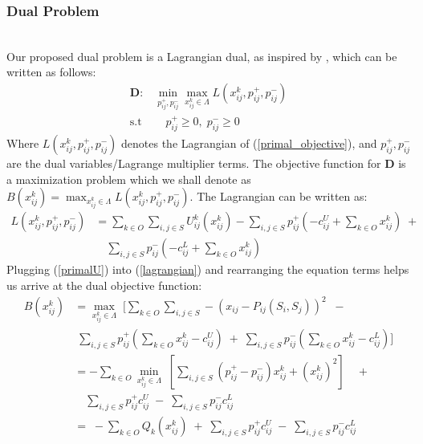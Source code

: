 \documentclass[sigconf]{acmart}
\begin{document}
\subsubsection{Dual Problem}\text{\\}
\\Our proposed dual problem is a Lagrangian dual, as inspired by \cite{low1999optimization}, which can be written as follows:
\begin{equation}\label{dual_problem}
\begin{aligned}
    \mathbf{D: } & \min_{p_{ij}^+, p_{ij}^-}\max_{x_{ij}^k \in \Lambda} L(x_{ij}^k, p_{ij}^+, p_{ij}^-)\\
    \text{s.t } & \quad p_{ij}^+ \geq 0, \; p_{ij}^- \geq 0
\end{aligned}
\end{equation}
Where $L(x_{ij}^k, p_{ij}^+, p_{ij}^-)$ denotes the Lagrangian of (\ref{primal_objective}), and $p_{ij}^+, p_{ij}^-$ are the dual variables/Lagrange multiplier terms. The objective function for $\mathbf{D}$ is a maximization problem which we shall denote as $B(x_{ij}^k) = \max_{x_{ij}^k \in \Lambda} L(x_{ij}^k, p_{ij}^+, p_{ij}^-)$. The Lagrangian can be written as:
\begin{equation}\label{lagrangian}
\begin{aligned}
    L(x_{ij}^k, p_{ij}^+, p_{ij}^-) & = \sum_{k \in O}\sum_{i, j \in S}U_{ij}^k(x_{ij}^k) - \sum_{i, j \in S} p_{ij}^+( - c_{ij}^U + \sum_{k \in O}x_{ij}^k) \; + \\
    & \quad \sum_{i, j \in S}p_{ij}^-(- c_{ij}^L + \sum_{k \in O} x_{ij}^k ) 
\end{aligned}
\end{equation}
Plugging (\ref{primalU}) into (\ref{lagrangian}) and rearranging the equation terms helps us arrive at the dual objective function:
\begin{equation}\label{dual_objective}
\begin{aligned}
    B(x_{ij}^k) & = \max_{x_{ij}^k \in \Lambda} \; [\sum_{k \in O}\sum_{i,j \in S} -(x_{ij} - P_{ij}(S_i, S_j))^2 \;\; - \\
    & \; \sum_{i, j \in S} p_{ij}^+(\sum_{k \in O}x_{ij}^k - c_{ij}^U) \; + \; \sum_{i, j \in S}p_{ij}^-(\sum_{k \in O} x_{ij}^k - c_{ij}^L)] \\
    & = -\sum_{k \in O}\min_{x_{ij}^k \in \Lambda} \; [\sum_{i, j \in S} (p_{ij}^+ - p_{ij}^-)x_{ij}^k + (x_{ij}^k)^2] \quad + \\
    & \quad \sum_{i, j \in S} p_{ij}^+ c_{ij}^U \; - \; \sum_{i, j \in S} p_{ij}^- c_{ij}^L \\
    & = \; - \sum_{k \in O} Q_k(x_{ij}^k) \; + \; \sum_{i, j \in S} p_{ij}^+ c_{ij}^U \; - \; \sum_{i, j \in S} p_{ij}^- c_{ij}^L 
\end{aligned}
\end{equation}
\end{document}
